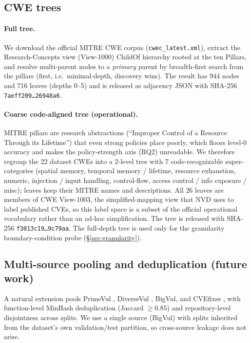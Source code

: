 \subsection{CWE trees}
\paragraph{Full tree.} We download the official MITRE CWE corpus
(\texttt{cwec\_latest.xml}), extract the Research-Concepts view (View-1000)
ChildOf hierarchy rooted at the ten Pillars, and resolve multi-parent nodes to a
\emph{primary} parent by breadth-first search from the pillars (first, i.e.\
minimal-depth, discovery wins). The result has 944 nodes and 716 leaves (depths
0--5) and is released as adjacency JSON with SHA-256
\texttt{7aeff209\ldots{}26948a6}.

\paragraph{Coarse code-aligned tree (operational).} MITRE pillars are research
abstractions (``Improper Control of a Resource Through its Lifetime'') that even
strong policies place poorly, which floors level-0 accuracy and makes the
policy-strength axis (RQ2) unreadable. We therefore regroup the
22 dataset CWEs into a 2-level tree with 7 code-recognizable super-categories
(spatial memory, temporal memory / lifetime, resource exhaustion, numeric,
injection / input handling, control-flow, access control / info exposure /
misc); leaves keep their MITRE names and descriptions. All $26$ leaves are
members of CWE View-1003, the simplified-mapping view that NVD uses to label
published CVEs, so this label space is a subset of the official operational
vocabulary rather than an ad-hoc simplification. The tree is released with
SHA-256 \texttt{f3013c19\ldots{}9c79aa}. The full-depth tree is used only for
the granularity boundary-condition probe (\S\ref{sec:granularity}).

\subsection{Multi-source pooling and deduplication (future work)}
A natural extension pools PrimeVul \citep{ding2024primevul}, DiverseVul
\citep{chen2023diversevul}, BigVul, and CVEfixes \citep{bhandari2021cvefixes},
with function-level MinHash deduplication (Jaccard $\ge 0.85$) and
repository-level disjointness across splits. We use a single source (BigVul)
with splits inherited from the dataset's own validation/test partition, so
cross-source leakage does not arise.

